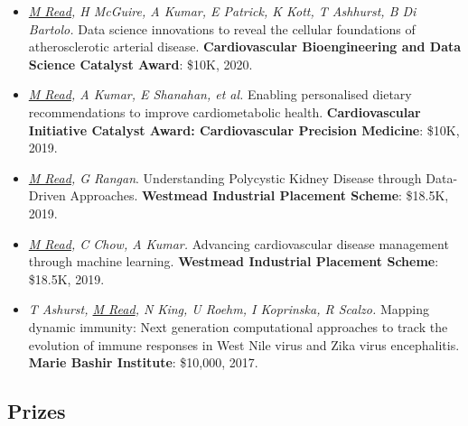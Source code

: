 \documentclass[a4paper]{article}
\begin{document}
\begin{itemize}
\item
\textit{\underline{M Read}, H McGuire, A Kumar, E Patrick, K Kott, T Ashhurst, B Di Bartolo.}
Data science innovations to reveal the cellular foundations of atherosclerotic arterial disease.
\textbf{Cardiovascular Bioengineering and Data Science Catalyst Award}: \$10K, 2020.

\item
\textit{\underline{M Read}, A Kumar, E Shanahan, et al.}
Enabling personalised dietary recommendations to improve cardiometabolic health.
\textbf{Cardiovascular Initiative Catalyst Award: Cardiovascular Precision Medicine}: \$10K, 2019.

\item
\textit{\underline{M Read}, G Rangan}.
Understanding Polycystic Kidney Disease through Data-Driven Approaches.
\textbf{Westmead Industrial Placement Scheme}: \$18.5K, 2019.

\item
\textit{\underline{M Read}, C Chow, A Kumar.}
Advancing cardiovascular disease management through machine learning.
\textbf{Westmead Industrial Placement Scheme}: \$18.5K, 2019.


\item
\textit{T Ashurst, \underline{M Read}, N King, U Roehm, I Koprinska, R Scalzo.}
Mapping dynamic immunity: Next generation computational approaches to track the evolution of immune responses in West Nile virus and Zika virus encephalitis.
\textbf{Marie Bashir Institute}: \$10,000, 2017.

\end{itemize}

\subsection*{Prizes}
\end{document}
